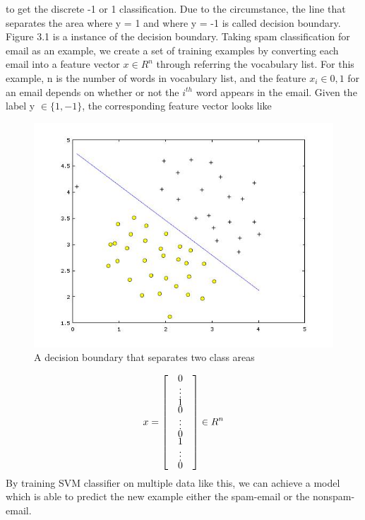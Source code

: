 to get the discrete -1 or 1 classification. Due to the circumstance, the line that separates the area where y = 1 and where y = -1 is called decision boundary. Figure 3.1 is a instance of the decision boundary. Taking spam classification for email as an example, we create a set of training examples by converting each email into a feature vector $x \in R^n$ through referring the vocabulary list. For this example, n is the number of words in vocabulary list, and the feature $x_i\in {0,1}$ for an email depends on whether or not the $i^{th}$ word appears in the email. Given the label y $\in \{1, -1\}$, the corresponding feature vector looks like 
\begin{figure}[!b]
    \includegraphics[width = \linewidth]{Fig1}
    \caption{A decision boundary that separates two class areas}
    \label{fig3.1}
\end{figure}
\begin{align*}
x = 
\renewcommand{\arraystretch}{0.4}
\begin{bmatrix}
        & 0 &\\
        & \vdots &\\
        & 1 &\\
        & 0 &\\
        & \vdots &\\
        & 0 &\\
        & 1 &\\
        & \vdots &\\
        & 0 &
    \end{bmatrix}
    \in R^n
\end{align*}
By training SVM classifier on multiple data like this, we can achieve a model which is able to predict the new example either the spam-email or the nonspam-email.\par   
